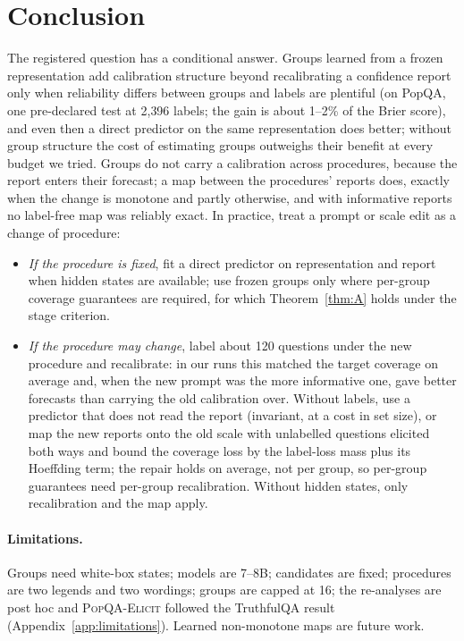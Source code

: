 \documentclass[twoside]{article}
\theoremstyle{definition}
\theoremstyle{remark}
\newcommand{\1}{\mathbf{1}}
\newcommand{\expname}[1]{\textsc{#1}}
\begin{document}
\section{Conclusion}
\label{sec:conclusion}
The registered question has a conditional answer. Groups learned from a frozen representation add
calibration structure beyond recalibrating a confidence report only when reliability differs between
groups and labels are plentiful (on PopQA, one pre-declared test at 2{,}396 labels; the gain is about
1--2\% of the Brier score), and even then a direct predictor on the same representation does better;
without group structure the cost of estimating groups outweighs their benefit at every budget we
tried. Groups do not carry a calibration across procedures, because the report enters their
forecast; a map between the procedures' reports does, exactly when the change is monotone and
partly otherwise, and with informative reports no label-free map was reliably exact. In practice, treat a prompt or scale edit as a change of procedure:
\begin{itemize}
  \item \emph{If the procedure is fixed}, fit a direct predictor on representation and report when hidden
  states are available; use frozen groups only where per-group coverage guarantees are required, for
  which Theorem~\ref{thm:A} holds under the stage criterion.
  \item \emph{If the procedure may change}, label about 120 questions under the new procedure and
  recalibrate: in our runs this matched the target coverage on average and, when the new prompt was the
  more informative one, gave better forecasts than carrying the old calibration over. Without labels, use
  a predictor that does not read the report (invariant, at a cost in set size), or map the new reports
  onto the old scale with unlabelled questions elicited both ways and bound the coverage loss by the
  label-loss mass plus its Hoeffding term; the repair holds on average, not per group, so per-group
  guarantees need per-group recalibration. Without hidden states, only recalibration and the map apply.
\end{itemize}

\paragraph{Limitations.} Groups need white-box states; models are 7--8B; candidates are fixed; procedures are
two legends and two wordings; groups are capped at 16; the re-analyses are post hoc and \expname{PopQA-Elicit}
followed the TruthfulQA result (Appendix~\ref{app:limitations}). Learned non-monotone maps are future work.
\end{document}
